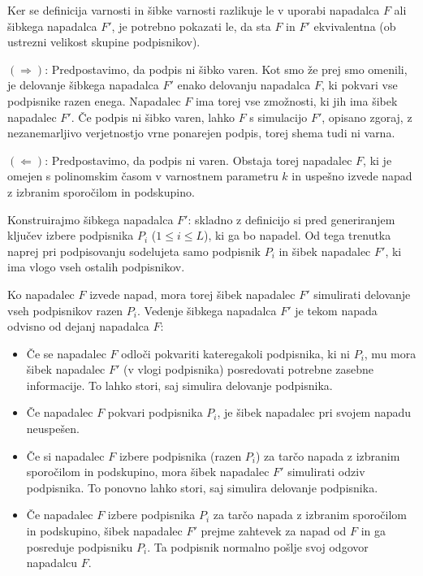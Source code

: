 \documentclass[isrm2, tisk]{fmfdelo}
\begin{document}
\begin{dokaz}
    Ker se definicija varnosti in šibke varnosti razlikuje le v uporabi napadalca $F$ ali šibkega
    napadalca $F'$, je potrebno pokazati le, da sta $F$ in $F'$ ekvivalentna (ob ustrezni velikost
    skupine podpisnikov).

    $(\Rightarrow)$: Predpostavimo, da podpis ni šibko varen. Kot smo že prej smo omenili, je delovanje
    šibkega napadalca $F'$ enako delovanju napadalca $F$, ki pokvari vse podpisnike razen enega.
    Napadalec $F$ ima torej vse zmožnosti, ki jih ima šibek napadalec $F'$. Če podpis ni šibko varen,
    lahko $F$ s simulacijo $F'$, opisano zgoraj, z nezanemarljivo verjetnostjo vrne ponarejen podpis,
    torej shema tudi ni varna.

    $(\Leftarrow)$: Predpostavimo, da podpis ni varen. Obstaja torej napadalec $F$, ki je omejen
    s polinomskim časom v varnostnem parametru $k$ in uspešno izvede napad z izbranim sporočilom in
    podskupino.

    Konstruirajmo šibkega napadalca $F'$: skladno z definicijo si pred generiranjem ključev izbere
    podpisnika $P_i$ ($1 \le i \le L$), ki ga bo napadel. Od tega trenutka naprej pri podpisovanju
    sodelujeta samo podpisnik $P_i$ in šibek napadalec $F'$, ki ima vlogo vseh ostalih podpisnikov.

    Ko napadalec $F$ izvede napad, mora torej šibek napadalec $F'$ simulirati delovanje vseh podpisnikov
    razen $P_i$. Vedenje šibkega napadalca $F'$ je tekom napada odvisno od dejanj napadalca $F$:
    \begin{itemize}
        \item Če se napadalec $F$ odloči pokvariti kateregakoli podpisnika, ki ni $P_i$, mu mora 
            šibek napadalec $F'$ (v vlogi podpisnika) posredovati potrebne zasebne informacije. To
            lahko stori, saj simulira delovanje podpisnika.
        \item Če napadalec $F$ pokvari podpisnika $P_i$, je šibek napadalec pri svojem napadu neuspešen.
        \item Če si napadalec $F$ izbere podpisnika (razen $P_i$) za tarčo napada z izbranim sporočilom
            in podskupino, mora šibek napadalec $F'$ simulirati odziv podpisnika. To ponovno lahko
            stori, saj simulira delovanje podpisnika.
        \item Če napadalec $F$ izbere podpisnika $P_i$ za tarčo napada z izbranim sporočilom in podskupino,
            šibek napadalec $F'$ prejme zahtevek za napad od $F$ in ga posreduje podpisniku $P_i$.
            Ta podpisnik normalno pošlje svoj odgovor napadalcu $F$.
    \end{itemize}


\end{dokaz}
\end{document}
